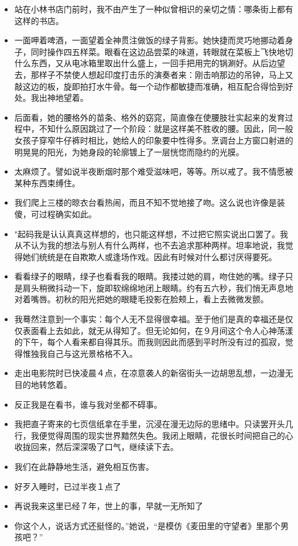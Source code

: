 \documentclass[UTF8,a4paper,8pt]{ctexart}
\begin{document}
\begin{itemize}
 	\item 站在小林书店门前时，我不由产生了一种似曾相识的亲切之情：哪条街上都有这样的书店。
 	\item 一面呷着啤酒，一面望着全神贯注做饭的绿子背影。她快捷而灵巧地挪动着身子，同时操作四五样菜。眼看在这边品尝菜的味道，转眼就在菜板上飞快地切什么东西，又从电冰箱里取出什么盛上，一回手把用完的锅涮好。从后边望去，那样子不禁使人想起印度打击乐的演奏者来：刚击响那边的吊钟，马上又敲这边的板，旋即拍打水牛骨。每一个动作都敏捷而准确，相互配合得恰到好处。我出神地望着。
 	\item 后面看，她的腰格外的苗条、格外的窈窕，简直像在使腰肢壮实起来的发育过程中，不知什么原因跳过了一个阶段：就是这样美不胜收的腰。因此，同一般女孩子穿窄牛仔裤时相比，她给人的印象要中性得多。烹调台上方窗口射进的明晃晃的阳光，为她身段的轮廓镀上了一层恍惚而隐约的光膜。
 	\item 太麻烦了。譬如说半夜断烟时那个难受滋味吧，等等。所以戒了。我不情愿被某种东西束缚住。
 	\item 我们爬上三楼的晾衣台看热闹，而且不知不觉地接了吻。这么说也许像是装傻，可过程确实如此。
 	\item "起码我是认认真真这样想的，也只能这样想，不过把它照实说出口罢了。我从不认为我的想法与别人有什么两样，也不去追求那种两样。坦率地说，我觉得她们统统是在自欺欺人或逢场作戏。因此有时候对什么都讨厌得要死。
 	\item 看看绿子的眼睛，绿子也看看我的眼睛。我搂过她的肩，吻住她的嘴。绿子只是肩头稍微抖动一下，旋即软绵绵地闭上眼睛。约有五六秒，我们悄无声息地对着嘴唇。初秋的阳光把她的眼睫毛投影在脸颊上，看上去微微发颤。
 	\item 我蓦然注意到一个事实：每个人无不显得很幸福。至于他们是真的幸福还是仅仅表面看上去如此，就无从得知了。但无论如何，在９月间这个令人心神荡漾的下午，每个人看来都自得其乐。而我则因此而感到平时所没有过的孤寂，觉得惟独我自己与这光景格格不入。
 	\item 走出电影院时已快凌晨４点，在凉意袭人的新宿街头一边胡思乱想，一边漫无目的地转悠着。
 	\item 反正我是在看书，谁与我对坐都不碍事。
 	\item 我把直子寄来的七页信纸拿在手里，沉浸在漫无边际的思绪中。只读罢开头几行，我便觉得周围的现实世界黯然失色。我闭上眼睛，花很长时间把自己的心收拢回来，然后深深吸了口气，继续读下去。
 	\item 我们在此静静地生活，避免相互伤害。
 	\item 好歹入睡时，已过半夜１点了
 	\item 再说我来这里已经７年，世上的事，早就一无所知了
 	\item 你这个人，说话方式还挺怪的。”她说，“是模仿《麦田里的守望者》里那个男孩吧？”

\end{itemize}
\end{document}
